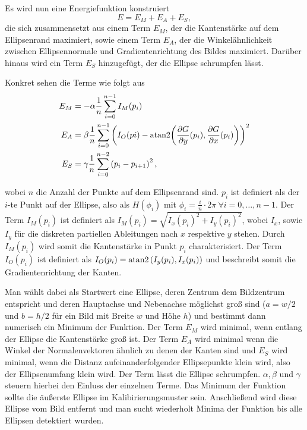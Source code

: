 Es wird nun eine Energiefunktion konstruiert
\[
	E = E_M + E_A + E_S,
\]
die sich zusammensetzt aus einem Term $E_M$, der die Kantenstärke auf dem Ellipsenrand maximiert, sowie einem Term $E_A$, der die Winkelähnlichkeit zwischen Ellipsennormale und Gradientenrichtung des Bildes maximiert. Darüber hinaus wird ein Term $E_S$ hinzugefügt, der die Ellipse schrumpfen lässt.

Konkret sehen die Terme wie folgt aus
\begin{equation}\label{eq:deformTerms}
	\begin{aligned}
		E_M &= -\alpha\frac{1}{n}\sum_{i=0}^{n-1}I_M(p_i) \\
		E_A &= \beta\frac{1}{n}\sum_{i=0}^{n-1}\left(I_O(pi) - \text{atan2}{\left(\frac{\partial G}{\partial y}(p_i), \frac{\partial G}{\partial x}(p_i)\right)}\right)^2 \\
		E_S &= \gamma\frac{1}{n}\sum_{i=0}^{n-2}\left(p_i - p_{i+1}\right)^2,
	\end{aligned}
\end{equation}

wobei $n$ die Anzahl der Punkte auf dem Ellipsenrand sind. $p_i$ ist definiert als der $i$-te Punkt auf der Ellipse, also als $H(\phi_i)$ mit $\phi_i = \frac{i}{n}\cdot2\pi ~\forall i = 0,\dotsc,n-1$.
Der Term $I_M(p_i)$ ist definiert als $I_M(p_i) = \sqrt{I_x(p_i)^2 + I_y(p_i)^2}$, wobei $I_x$, sowie $I_y$ für die diskreten partiellen Ableitungen nach $x$ respektive $y$ stehen. Durch $I_M(p_i)$ wird somit die Kantenstärke in Punkt $p_i$ charakterisiert. Der Term $I_O(p_i)$ ist definiert als $I_O(p_i) = \text{atan2}\left(I_y(p_i),I_x(p_i)\right)$
und beschreibt somit die Gradientenrichtung der Kanten.

Man wählt dabei als Startwert eine Ellipse, deren Zentrum dem Bildzentrum entspricht und deren Hauptachse und Nebenachse möglichst groß sind ($a = w/2$ und $b = h/2$ für ein Bild mit Breite $w$ und Höhe $h$) und bestimmt dann numerisch ein Minimum der Funktion. Der Term $E_M$ wird minimal, wenn entlang der Ellipse die Kantenstärke groß ist. Der Term $E_A$ wird minimal wenn die Winkel der Normalenvektoren ähnlich zu denen der Kanten sind und $E_S$ wird minimal, wenn die Distanz aufeinanderfolgender Ellipsepunkte klein wird, also der Ellipsenumfang klein wird. Der Term lässt die Ellipse schrumpfen. $\alpha, \beta$ und $\gamma$ steuern hierbei den Einluss der einzelnen Terme. Das Minimum der Funktion sollte die äußerste Ellipse im Kalibirierungsmuster sein. Anschließend wird diese Ellipse vom Bild entfernt und man sucht wiederholt Minima der Funktion bis alle Ellipsen detektiert wurden.




